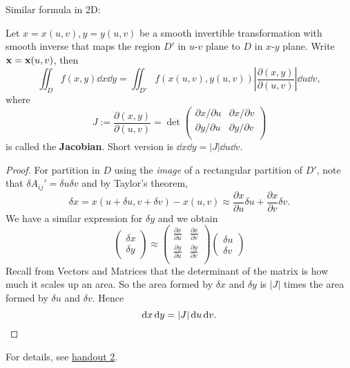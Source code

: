 Similar formula in 2D:
\begin{proposition}
    Let $ x=x(u,v),y=y(u,v) $ be a smooth invertible transformation with smooth inverse that maps the region $D'$ in $u$-$v$ plane to $D$ in $x$-$y$ plane. Write $ {\bf x}={\bf x}(u,v) $, then 
    \[
        \iint_{D}f(x,y)\dd x\dd y = \iint_{D'} f(x(u,v),y(u,v)) \left| \frac{\partial (x,y)}{\partial (u,v)}  \right| \dd u\dd v,
    \]
    where 
    \[
        J:=\frac{\partial (x,y)}{\partial (u,v)} = \det \begin{pmatrix}
            \partial x/\partial u  & \partial x/\partial v  \\
            \partial y/\partial u  & \partial y/\partial v  \\
        \end{pmatrix}
    \]
    is called the \textbf{Jacobian}. Short version is $ \dd x\dd y = |J| \dd u\dd v. $
\end{proposition}

\begin{proof}
    For partition in $D$ using the \textit{image} of a rectangular partition of $D'$, note that $ \delta A_{ij}'=\delta u \delta v $ and by Taylor's theorem,
    \[
        \delta x = x(u + \delta u, v + \delta v) - x(u, v) \approx \frac{\partial x}{\partial u}\delta u + \frac{\partial x}{\partial v}\delta v.
    \]
    We have a similar expression for $\delta y$ and we obtain
    \[
        \begin{pmatrix}
        \delta x\\
        \delta y
        \end{pmatrix}
        \approx
        \begin{pmatrix}
        \frac{\partial x}{\partial u} & \frac{\partial x}{\partial v}\\
        \frac{\partial y}{\partial u} & \frac{\partial y}{\partial v}\\
        \end{pmatrix}
        \begin{pmatrix}
        \delta u\\
        \delta v
        \end{pmatrix}
    \]
    Recall from Vectors and Matrices that the determinant of the matrix is how much it scales up an area. So the area formed by $\delta x$ and $\delta y$ is $|J|$ times the area formed by $\delta u$ and $\delta v$. Hence
    \[
        \mathrm{d} x\,\mathrm{d} y = |J| \,\mathrm{d} u\,\mathrm{d} v.\qedhere
    \]
\end{proof}
For details, see \href{http://jt775.user.srcf.net/IA-Lent/handouts/vc_handout2.pdf}{handout 2}.

